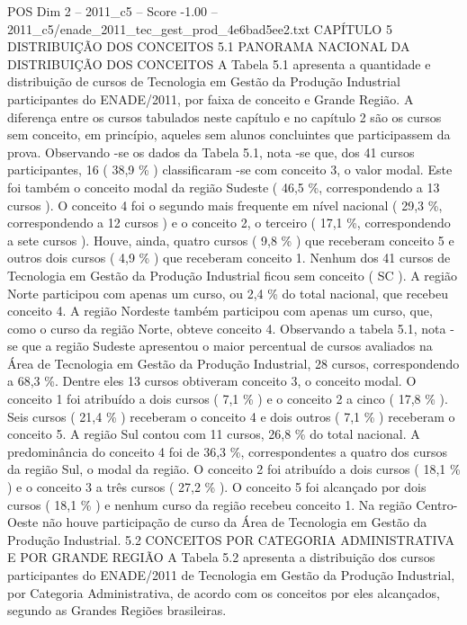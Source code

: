 \begin{textsample}{POS Dim 2 – 2011\_c5 – Score -1.00 – 2011\_c5/enade\_2011\_tec\_gest\_prod\_4e6bad5ee2.txt}  \label{ex:f2_pos_349}
CAPÍTULO 5 DISTRIBUIÇÃO DOS CONCEITOS 5.1 PANORAMA NACIONAL DA DISTRIBUIÇÃO DOS CONCEITOS A Tabela 5.1 apresenta a quantidade e distribuição de cursos de Tecnologia em Gestão da Produção Industrial participantes do ENADE/2011, por faixa de conceito e Grande Região.
A diferença entre os cursos tabulados neste capítulo e no capítulo 2 são os cursos sem conceito, em princípio, aqueles sem alunos concluintes que participassem da prova.
Observando -se os dados da Tabela 5.1, nota -se que, dos 41 cursos participantes, 16 ( 38,9 \% ) classificaram -se com conceito 3, o valor modal.
Este foi também o conceito modal da região Sudeste ( 46,5 \%, correspondendo a 13 cursos ).
O conceito 4 foi o segundo mais frequente em nível nacional ( 29,3 \%, correspondendo a 12 cursos ) e o conceito 2, o terceiro ( 17,1 \%, correspondendo a sete cursos ).
Houve, ainda, quatro cursos ( 9,8 \% ) que receberam conceito 5 e outros dois cursos ( 4,9 \% ) que receberam conceito 1.
Nenhum dos 41 cursos de Tecnologia em Gestão da Produção Industrial ficou sem conceito ( SC ).
A região Norte participou com apenas um curso, ou 2,4 \% do total nacional, que recebeu conceito 4.
A região Nordeste também participou com apenas um curso, que, como o curso da região Norte, obteve conceito 4.
Observando a tabela 5.1, nota -se que a região Sudeste apresentou o maior percentual de cursos avaliados na Área de Tecnologia em Gestão da Produção Industrial, 28 cursos, correspondendo a 68,3 \%.
Dentre eles 13 cursos obtiveram conceito 3, o conceito modal.
O conceito 1 foi atribuído a dois cursos ( 7,1 \% ) e o conceito 2 a cinco ( 17,8 \% ).
Seis cursos ( 21,4 \% ) receberam o conceito 4 e dois outros ( 7,1 \% ) receberam o conceito 5.
A região Sul contou com 11 cursos, 26,8 \% do total nacional.
A predominância do conceito 4 foi de 36,3 \%, correspondentes a quatro dos cursos da região Sul, o modal da região.
O conceito 2 foi atribuído a dois cursos ( 18,1 \% ) e o conceito 3 a três cursos ( 27,2 \% ).
O conceito 5 foi alcançado por dois cursos ( 18,1 \% ) e nenhum curso da região recebeu conceito 1.
Na região Centro-Oeste não houve participação de curso da Área de Tecnologia em Gestão da Produção Industrial. 5.2 CONCEITOS POR CATEGORIA ADMINISTRATIVA E POR GRANDE REGIÃO A Tabela 5.2 apresenta a distribuição dos cursos participantes do ENADE/2011 de Tecnologia em Gestão da Produção Industrial, por Categoria Administrativa, de acordo com os conceitos por eles alcançados, segundo as Grandes Regiões brasileiras.

\end{textsample}
